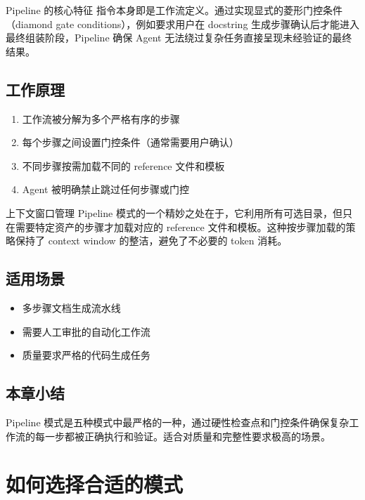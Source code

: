 \documentclass[a4paper]{article}
\begin{document}
\begin{importantbox}{Pipeline 的核心特征}
指令本身即是工作流定义。通过实现显式的菱形门控条件（diamond gate conditions），例如要求用户在 docstring 生成步骤确认后才能进入最终组装阶段，Pipeline 确保 Agent 无法绕过复杂任务直接呈现未经验证的最终结果。
\end{importantbox}

\subsection{工作原理}

\begin{enumerate}
    \item 工作流被分解为多个严格有序的步骤
    \item 每个步骤之间设置门控条件（通常需要用户确认）
    \item 不同步骤按需加载不同的 reference 文件和模板
    \item Agent 被明确禁止跳过任何步骤或门控
\end{enumerate}

\begin{knowledgebox}{上下文窗口管理}
Pipeline 模式的一个精妙之处在于，它利用所有可选目录，但只在需要特定资产的步骤才加载对应的 reference 文件和模板。这种按步骤加载的策略保持了 context window 的整洁，避免了不必要的 token 消耗。
\end{knowledgebox}

\subsection{适用场景}

\begin{itemize}
    \item 多步骤文档生成流水线
    \item 需要人工审批的自动化工作流
    \item 质量要求严格的代码生成任务
\end{itemize}

\subsection{本章小结}

Pipeline 模式是五种模式中最严格的一种，通过硬性检查点和门控条件确保复杂工作流的每一步都被正确执行和验证。适合对质量和完整性要求极高的场景。

\section{如何选择合适的模式}
\end{document}
